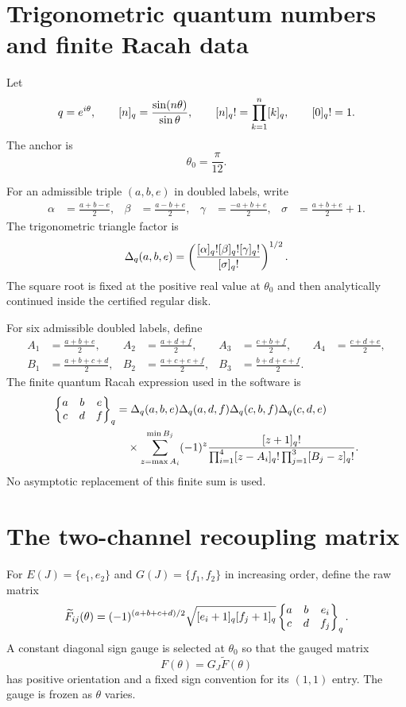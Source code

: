 \section{Trigonometric quantum numbers and finite Racah data}
Let
\begin{equation}
q=e^{i\theta},
\qquad
[n]_q=\frac{\sin(n\theta)}{\sin\theta},
\qquad
[n]_q!=\prod_{k=1}^{n}[k]_q,
\qquad
[0]_q!=1.
\label{eq:qnumber}
\end{equation}
The anchor is
\begin{equation}
\theta_0=\frac{\pi}{12}.
\label{eq:anchor}
\end{equation}

For an admissible triple $(a,b,e)$ in doubled labels, write
\begin{align}
\alpha&=\frac{a+b-e}{2},&
\beta&=\frac{a-b+e}{2},&
\gamma&=\frac{-a+b+e}{2},&
\sigma&=\frac{a+b+e}{2}+1.
\end{align}
The trigonometric triangle factor is
\begin{equation}
\Delta_q(a,b,e)
=
\left(
\frac{[\alpha]_q![\beta]_q![\gamma]_q!}
{[\sigma]_q!}
\right)^{1/2}.
\label{eq:qdelta}
\end{equation}
The square root is fixed at the positive real value at $\theta_0$ and then analytically continued inside the certified regular disk.

For six admissible doubled labels, define
\begin{align}
A_1&=\frac{a+b+e}{2},& A_2&=\frac{a+d+f}{2},&
A_3&=\frac{c+b+f}{2},& A_4&=\frac{c+d+e}{2},\\
B_1&=\frac{a+b+c+d}{2},&
B_2&=\frac{a+c+e+f}{2},&
B_3&=\frac{b+d+e+f}{2}.
\end{align}
The finite quantum Racah expression used in the software is
\begin{align}
\begin{Bmatrix}a&b&e\\c&d&f\end{Bmatrix}_{q}
&=
\Delta_q(a,b,e)\Delta_q(a,d,f)
\Delta_q(c,b,f)\Delta_q(c,d,e)
\nonumber\\
&\quad\times
\sum_{z=\max A_i}^{\min B_j}
(-1)^z
\frac{[z+1]_q!}
{\prod_{i=1}^{4}[z-A_i]_q!\prod_{j=1}^{3}[B_j-z]_q!}.
\label{eq:qracah}
\end{align}
No asymptotic replacement of this finite sum is used.

\section{The two-channel recoupling matrix}
For $E(J)=\{e_1,e_2\}$ and $G(J)=\{f_1,f_2\}$ in increasing order, define the raw matrix
\begin{equation}
\widetilde F_{ij}(\theta)
=
(-1)^{(a+b+c+d)/2}
\sqrt{[e_i+1]_q[f_j+1]_q}
\begin{Bmatrix}a&b&e_i\\c&d&f_j\end{Bmatrix}_{q}.
\label{eq:rawF}
\end{equation}
A constant diagonal sign gauge is selected at $\theta_0$ so that the gauged matrix
\begin{equation}
F(\theta)=G_J\widetilde F(\theta)
\label{eq:gaugedF}
\end{equation}
has positive orientation and a fixed sign convention for its $(1,1)$ entry.  The gauge is frozen as $\theta$ varies.

